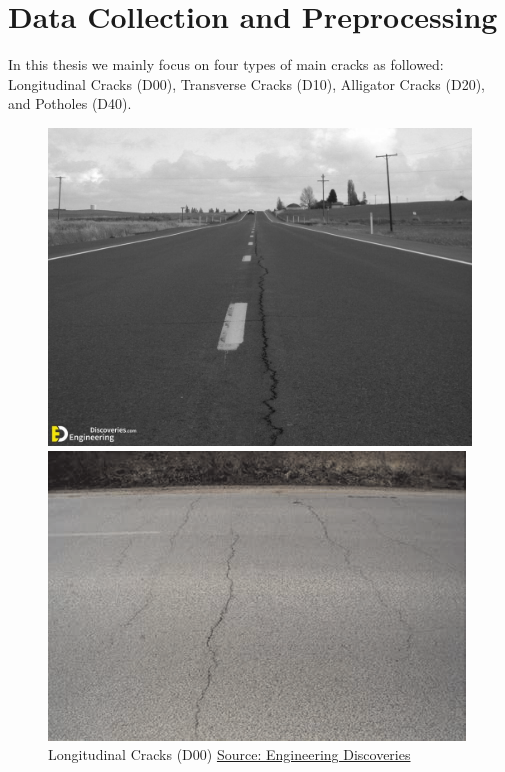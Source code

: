 \section{Data Collection and Preprocessing}
In this thesis we mainly focus on four types of main cracks as followed: Longitudinal Cracks (D00), Transverse Cracks (D10), Alligator Cracks (D20), and Potholes (D40).

\begin{figure}[h]
    \centering
    \begin{minipage}{0.45\textwidth}
        \centering
        \includegraphics[width=\linewidth]{figures/long.jpeg}
        \caption{Longitudinal Cracks (D00) \href{https://engineeringdiscoveries.com/type-of-pavement-cracks-and-how-to-repair/}{Source: Engineering Discoveries}}
    \end{minipage}
    \hfill
    \begin{minipage}{0.45\textwidth}
        \centering
        \includegraphics[width=\linewidth]{figures/transverse.png}

\end{minipage}
\end{figure}
